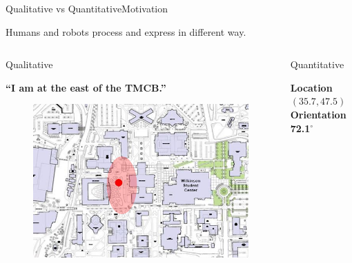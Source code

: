 \begin{frame}{Qualitative vs Quantitative}{Motivation}

\begin{block}{}

Humans and robots process and express in different way.

\end{block}

\begin{columns}

\begin{block}{ Qualitative }

\begin{minipage}[t][5cm][t]{.9\textwidth}

\centering
{\bf ``I am at the east of the TMCB.''}

\begin{figure}
	\centering
	\includegraphics[width=\linewidth]{figure/human_localization_rough}
\end{figure}
\end{minipage}

\end{block}


\begin{block}{ Quantitative }

\begin{minipage}[t][5cm][t]{.9\textwidth}

\centering
{\bf Location $( 35.7 , 47.5 )$ \\ Orientation 72.1$^{\circ}$}


\end{minipage}
\end{block}
\end{columns}
\end{frame}
